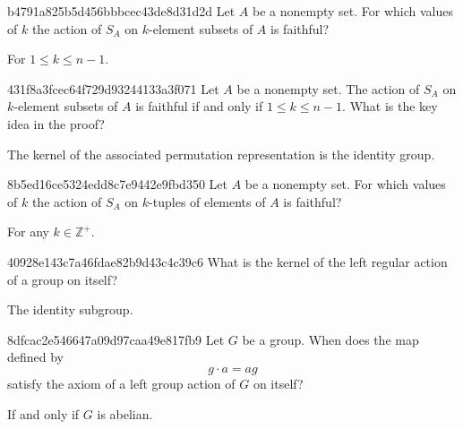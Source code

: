 \begin{note}{b4791a825b5d456bbbcec43de8d31d2d}
    Let \({ A }\) be a nonempty set.
    For which values of \({ k }\) the action of \({ S_A }\) on \({ k }\)-element subsets of \({ A }\) is faithful?

    \begin{cloze}{1}
        For \({ 1 \leq k \leq n - 1 }\).
    \end{cloze}
\end{note}

\begin{note}{431f8a3fcec64f729d93244133a3f071}
    Let \({ A }\) be a nonempty set.
    The action of \({ S_A }\) on \({ k }\)-element subsets of \({ A }\) is faithful if and only if \({ 1 \leq k \leq n - 1 }\).
    What is the key idea in the proof?

    \begin{cloze}{1}
        The kernel of the associated permutation representation is the identity group.
    \end{cloze}
\end{note}

\begin{note}{8b5ed16ce5324edd8c7e9442e9fbd350}
    Let \({ A }\) be a nonempty set.
    For which values of \({ k }\) the action of \({ S_A }\) on \({ k }\)-tuples of elements of \({ A }\) is faithful?

    \begin{cloze}{1}
        For any \({ k \in \mathbb Z^{+} }\).
    \end{cloze}
\end{note}

\begin{note}{40928e143c7a46fdae82b9d43c4c39c6}
    What is the kernel of the left regular action of a group on itself?

    \begin{cloze}{1}
        The identity subgroup.
    \end{cloze}
\end{note}

\begin{note}{8dfcac2e546647a09d97caa49e817fb9}
    Let \({ G }\) be a group. When does the map defined by
    \[
        g \cdot a = ag
    \]
    satisfy the axiom of a left group action of \({ G }\) on itself?

    \begin{cloze}{1}
        If and only if \({ G }\) is abelian.
    \end{cloze}
\end{note}

